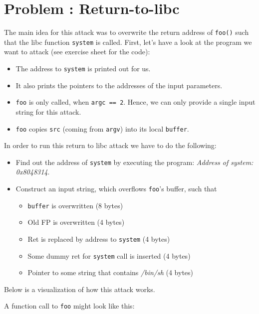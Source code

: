 \documentclass[12pt]{scrartcl}
\newcounter{exnum}
\newcommand{\exercise}[1]{\section*{Problem \theexnum\stepcounter{exnum}: #1}}
\begin{document}
\setcounter{exnum}{3}
\exercise{Return-to-libc}

The main idea for this attack was to overwrite the return address of \texttt{foo()} such that the libc function \texttt{system} is called.
First, let's have a look at the program we want to attack (see exercise sheet for the code):

\begin{itemize}
      \item The address to \texttt{system} is printed out for us.
      \item It also prints the pointers to the addresses of the input parameters.
      \item \texttt{foo} is only called, when \texttt{argc == 2}. Hence, we can only provide a single input string for this attack.
      \item \texttt{foo} copies \texttt{src} (coming from \texttt{argv}) into its local \texttt{buffer}.
\end{itemize}

In order to run this return to libc attack we have to do the following:
\begin{itemize}
      \item Find out the address of \texttt{system} by executing the program: \textit{Address of system: 0x8048314}.
      \item Construct an input string, which overflows \texttt{foo}'s buffer, such that
            \begin{itemize}
                  \item \texttt{buffer} is overwritten (8 bytes)
                  \item Old FP is overwritten (4 bytes)
                  \item Ret is replaced by address to \texttt{system} (4 bytes)
                  \item Some dummy ret for \texttt{system} call is inserted (4 bytes)
                  \item Pointer to some string that contains \textit{/bin/sh} (4 bytes)
            \end{itemize}
\end{itemize}

Below is a visualization of how this attack works.

A function call to \texttt{foo} might look like this:\\
\end{document}
